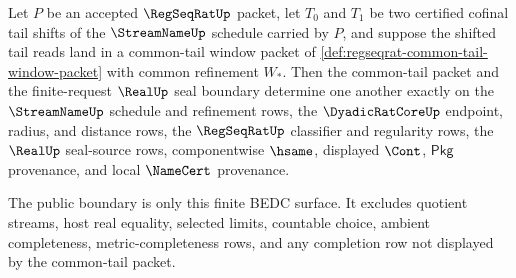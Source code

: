\begin{theorem}
\label{thm:regseqrat-common-tail-real-boundary-equivalence}
Let $P$ be an accepted $\RegSeqRatUp$ packet, let $T_0$ and $T_1$ be two certified cofinal tail shifts of the $\StreamNameUp$ schedule carried by $P$, and suppose the shifted tail reads land in a common-tail window packet of \autoref{def:regseqrat-common-tail-window-packet} with common refinement $W_\ast$. Then the common-tail packet and the finite-request $\RealUp$ seal boundary determine one another exactly on the $\StreamNameUp$ schedule and refinement rows, the $\DyadicRatCoreUp$ endpoint, radius, and distance rows, the $\RegSeqRatUp$ classifier and regularity rows, the $\RealUp$ seal-source rows, componentwise $\hsame$, displayed $\Cont$, $\mathsf{Pkg}$ provenance, and local $\NameCert$ provenance.

The public boundary is only this finite BEDC surface. It excludes quotient streams, host real equality, selected limits, countable choice, ambient completeness, metric-completeness rows, and any completion row not displayed by the common-tail packet.
\end{theorem}
